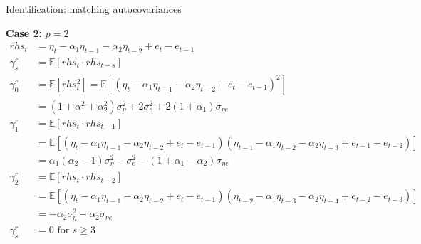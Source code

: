\documentclass[notes,blackandwhite,mathsans,usenames,dvipsnames]{beamer}
\begin{document}
\begin{frame}{Identification: matching autocovariances}

\bigskip\textbf{Case 2:} $p=2$ \scriptsize
\begin{align*}
rhs_t &= \eta_t - \alpha_1 \eta_{t-1} - \alpha_2 \eta_{t-2} + e_t - e_{t-1}\\[3ex]
\gamma_s^r &= \mathbb{E}[rhs_t \cdot rhs_{t-s}]\\[3ex]
\gamma_0^r &= \mathbb{E}\left[rhs_t ^2\right] = \mathbb{E}\left[(\eta_t - \alpha_1 \eta_{t-1}- \alpha_2 \eta_{t-2} + e_t - e_{t-1})^2\right]\\
&= \left(1+\alpha_1^2+\alpha_2^2\right)\sigma^2_\eta + 2\sigma^2_e + 2\left(1+\alpha_1\right)\sigma_{\eta e}\\[3ex]
\gamma_1^r &= \mathbb{E}\left[rhs_t \cdot rhs_{t-1}\right]\\
& = \mathbb{E}\left[(\eta_t - \alpha_1 \eta_{t-1}- \alpha_2 \eta_{t-2} + e_t - e_{t-1})(\eta_{t-1} - \alpha_1 \eta_{t-2}- \alpha_2 \eta_{t-3} + e_{t-1} - e_{t-2})\right]\\
&= \alpha_1\left(\alpha_2-1\right)\sigma^2_\eta -\sigma^2_e - \left(1+\alpha_1-\alpha_2\right)\sigma_{\eta e}\\[3ex]
\gamma_2^r &= \mathbb{E}\left[rhs_t \cdot rhs_{t-2}\right]\\
& = \mathbb{E}\left[(\eta_t - \alpha_1 \eta_{t-1}- \alpha_2 \eta_{t-2} + e_t - e_{t-1})(\eta_{t-2} - \alpha_1 \eta_{t-3}- \alpha_2 \eta_{t-4} + e_{t-2} - e_{t-3})\right]\\
&= -\alpha_2\sigma^2_\eta -\alpha_2\sigma_{\eta e}\\[3ex]
\gamma_s^r &= 0 \text{ for } s\geq3
\end{align*}

\end{frame}
\end{document}
